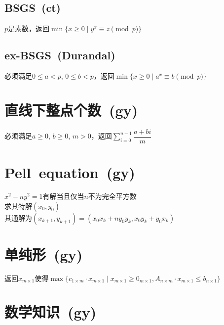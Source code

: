     \subsection*{BSGS\ \small(ct)}
        $ p $是素数，返回$ \min\lbrace x \geq 0 \mid y^x \equiv z \pmod p \rbrace $
    \subsection*{ex-BSGS\ \small(Durandal)}
        必须满足$ 0 \leq a < p $, $ 0 \leq b < p $，返回$ \min\lbrace x \geq 0 \mid a^x \equiv b \pmod p\rbrace $

\section{直线下整点个数\ \small(gy)}
    必须满足$ a \geq 0 $, $ b \geq 0 $, $ m > 0 $，返回$ \sum\limits_{i=0}^{n-1} \dfrac{a + bi}{m} $

\section{Pell\ equation\ \small(gy)}
    $ x^2 - n y^2 = 1 $有解当且仅当$ n $不为完全平方数
    \\求其特解$ (x_0, y_0) $
    \\其通解为$ (x_{k + 1}, y_{k + 1}) = (x_0 x_k + n y_0 y_k, x_0 y_k + y_0 x_k ) $

\section{单纯形\ \small(gy)}
    返回$ x_{m \times 1} $使得$ \max \lbrace c_{1 \times m} \cdot x_{m \times 1} \mid x_{m \times 1} \geq 0_{m \times 1}, A_{n \times m} \cdot x_{m \times 1} \leq b_{n \times 1} \rbrace $

\section{数学知识\ \small(gy)}
    

